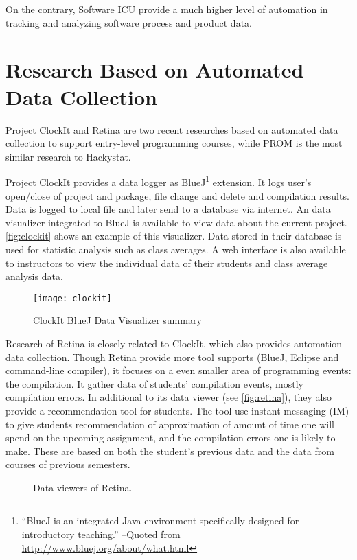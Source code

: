 On the contrary, Software ICU provide a much higher level of automation in tracking and analyzing software process and product data.


\section {Research Based on Automated Data Collection}
Project ClockIt and Retina are two recent researches based on automated data collection to support entry-level programming courses, while PROM is the most similar research to Hackystat.

Project ClockIt provides a data logger as BlueJ\footnote{``BlueJ is an integrated Java environment specifically designed for introductory teaching.'' --Quoted from \url{http://www.bluej.org/about/what.html}}
 extension. It logs user's open/close of project and package, file change and delete and compilation results. Data is logged to local file and later send to a database via internet. An data visualizer integrated to BlueJ is available to view data about the current project. \autoref{fig:clockit} shows an example of this visualizer. Data stored in their database is used for statistic analysis such as class averages. A web interface is also available to instructors to view the individual data of their students and class average analysis data.

\begin{figure}[htbp] %
   \centering
   \texttt{[image: clockit]} 
   \caption{ClockIt BlueJ Data Visualizer summary}
   \label{fig:clockit}
\end{figure}

Research of Retina is closely related to ClockIt, which also provides automation data collection. Though Retina provide more tool supports (BlueJ, Eclipse and command-line compiler), it focuses on a even smaller area of programming events: the compilation. It gather data of students' compilation events, mostly compilation errors. In additional to its data viewer (see \autoref{fig:retina}), they also provide a recommendation tool for students. The tool use instant messaging (IM) to give students recommendation of approximation of amount of time one will spend on the upcoming assignment, and the compilation errors one is likely to make. These are based on both the student's previous data and the data from courses of previous semesters. 

\begin{figure}[htbp]
     \centering
          
     \caption{Data viewers of Retina.}
     \label{fig:retina}
\end{figure}

